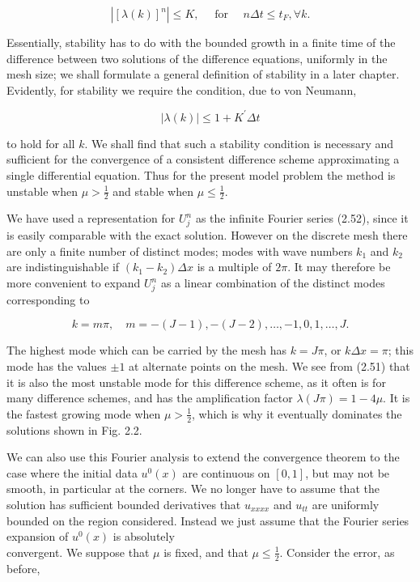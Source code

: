 \documentclass[10pt]{article}
\begin{document}
\[
\left|[\lambda(k)]^{n}\right| \leq K, \quad \text { for } \quad n \Delta t \leq t_{F}, \forall k .
\]

Essentially, stability has to do with the bounded growth in a finite time of the difference between two solutions of the difference equations, uniformly in the mesh size; we shall formulate a general definition of stability in a later chapter. Evidently, for stability we require the condition, due to von Neumann,

\[
|\lambda(k)| \leq 1+K^{\prime} \Delta t
\]

to hold for all \(k\). We shall find that such a stability condition is necessary and sufficient for the convergence of a consistent difference scheme approximating a single differential equation. Thus for the present model problem the method is unstable when \(\mu>\frac{1}{2}\) and stable when \(\mu \leq \frac{1}{2}\).

We have used a representation for \(U_{j}^{n}\) as the infinite Fourier series (2.52), since it is easily comparable with the exact solution. However on the discrete mesh there are only a finite number of distinct modes; modes with wave numbers \(k_{1}\) and \(k_{2}\) are indistinguishable if \(\left(k_{1}-k_{2}\right) \Delta x\) is a multiple of \(2 \pi\). It may therefore be more convenient to expand \(U_{j}^{n}\) as a linear combination of the distinct modes corresponding to

\[
k=m \pi, \quad m=-(J-1),-(J-2), \ldots,-1,0,1, \ldots, J .
\]

The highest mode which can be carried by the mesh has \(k=J \pi\), or \(k \Delta x=\pi\); this mode has the values \(\pm 1\) at alternate points on the mesh. We see from (2.51) that it is also the most unstable mode for this difference scheme, as it often is for many difference schemes, and has the amplification factor \(\lambda(J \pi)=1-4 \mu\). It is the fastest growing mode when \(\mu>\frac{1}{2}\), which is why it eventually dominates the solutions shown in Fig. 2.2.

We can also use this Fourier analysis to extend the convergence theorem to the case where the initial data \(u^{0}(x)\) are continuous on \([0,1]\), but may not be smooth, in particular at the corners. We no longer have to assume that the solution has sufficient bounded derivatives that \(u_{x x x x}\) and \(u_{t t}\) are uniformly bounded on the region considered. Instead we just assume that the Fourier series expansion of \(u^{0}(x)\) is absolutely\\
convergent. We suppose that \(\mu\) is fixed, and that \(\mu \leq \frac{1}{2}\). Consider the error, as before,
\end{document}

